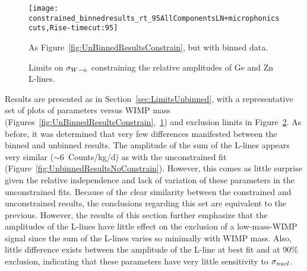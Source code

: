 			\begin{figure}
				\centering				
				\texttt{[image: constrained\_binnedresults\_rt\_95AllComponentsLN+microphonicscuts,Rise-timecut:95]}
								
				\caption[Results from an binned fit, constraints on relative amplitude of Ge and Zn lines]
				{As Figure~\ref{fig:UnBinnedResultsConstrain}, but with binned data.}
				\label{fig:BinnedResultsConstrain}
			\end{figure}
			
			\begin{sidewaysfigure}
				\centering
				\caption[Limits on $\sigman$ constraining the relative amplitudes of Ge and Zn L-lines]
				{Limits on $\sigman$ constraining the relative amplitudes of Ge and Zn L-lines.}
				\label{fig:ConstrainedLimits}
			\end{sidewaysfigure}		
			
Results are presented as in Section~\ref{sec:LimitsUnbinned}, with a representative set of plots of parameters versus WIMP mass (Figures~\ref{fig:UnBinnedResultsConstrain},~\ref{fig:BinnedResultsConstrain}) and exclusion limits in Figure~\ref{fig:ConstrainedLimits}.  As before, it was determined that very few differences manifested between the binned and unbinned results.  The amplitude of the sum of the L-lines appears very similar ($\sim6$~Counts/kg/d) as with the unconstrained fit (Figure~\ref{fig:UnbinnedResultsNoConstrain}).  However, this comes as little surprise given the relative independence and lack of variation of these parameters in the unconstrained fits.  Because of the clear similarity between the constrained and unconstrained results, the conclusions regarding this set are equivalent to the previous.  However, the results of this section further emphasize that the amplitudes of the L-lines have little effect on the exclusion of a low-mass-WIMP signal since the sum of the L-lines varies so minimally with WIMP mass.  Also, little difference exists between the amplitude of the L-line at best fit and at 90\% exclusion, indicating that these parameters have very little sensitivity to $\sigma_{nucl}$.

